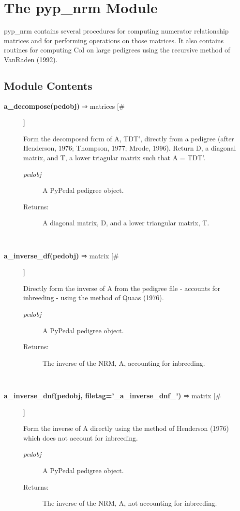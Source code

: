 \documentclass{article}
\begin{document}
\section*{The pyp\_nrm Module}
\par pyp\_nrm contains several procedures for computing numerator relationship matrices and for
performing operations on those matrices.  It also contains routines for computing CoI on
large pedigrees using the recursive method of VanRaden (1992).
\subsection*{Module Contents}
\begin{description}
\item[\textbf{a\_decompose(pedobj)} ⇒ matrices [\#]
]
\par Form the decomposed form of A, TDT', directly from a pedigree (after
Henderson, 1976; Thompson, 1977; Mrode, 1996).  Return D, a diagonal
matrix, and T, a lower triagular matrix such that A = TDT'.
\begin{description}
\item[\textit{pedobj}
]
A PyPedal pedigree object.
\item[Returns:
]
A diagonal matrix, D, and a lower triangular matrix, T.
\end{description}\\

\item[\textbf{a\_inverse\_df(pedobj)} ⇒ matrix [\#]
]
\par Directly form the inverse of A from the pedigree file - accounts for
inbreeding - using the method of Quaas (1976).
\begin{description}
\item[\textit{pedobj}
]
A PyPedal pedigree object.
\item[Returns:
]
The inverse of the NRM, A, accounting for inbreeding.
\end{description}\\

\item[\textbf{a\_inverse\_dnf(pedobj, filetag='\_a\_inverse\_dnf\_')} ⇒ matrix [\#]
]
\par Form the inverse of A directly using the method of Henderson (1976) which
does not account for inbreeding.
\begin{description}
\item[\textit{pedobj}
]
A PyPedal pedigree object.
\item[Returns:
]
The inverse of the NRM, A, not accounting for inbreeding.
\end{description}\\


\end{description}
\end{document}
